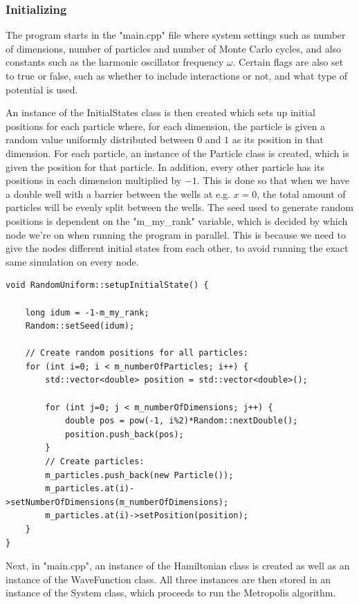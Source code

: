 \documentclass[../main.tex]{subfiles}
\begin{document}
\subsubsection{Initializing}

The program starts in the "main.cpp" file where system settings such as number of dimensions, number of particles and number of Monte Carlo cycles, and also constants such as the harmonic oscillator frequency $\omega$. Certain flags are also set to true or false, such as whether to include interactions or not, and what type of potential is used. 

An instance of the InitialStates class is then created which sets up initial positions for each particle where, for each dimension, the particle is given a random value uniformly distributed between $0$ and $1$ as its position in that dimension. For each particle, an instance of the Particle class is created, which is given the position for that particle. In addition, every other particle has its positions in each dimension multiplied by $-1$. This is done so that when we have a double well with a barrier between the wells at e.g. $x=0$, the total amount of particles will be evenly split between the wells. The seed used to generate random positions is dependent on the "m\_my\_rank" variable, which is decided by which node we're on when running the program in parallel. This is because we need to give the nodes different initial states from each other, to avoid running the exact same simulation on every node. 

\lstset{language=c++}
\begin{lstlisting}[title={Setting up the Initial State}]
void RandomUniform::setupInitialState() {

    long idum = -1-m_my_rank;
    Random::setSeed(idum);

    // Create random positions for all particles:
    for (int i=0; i < m_numberOfParticles; i++) {
        std::vector<double> position = std::vector<double>();

        for (int j=0; j < m_numberOfDimensions; j++) {
            double pos = pow(-1, i%2)*Random::nextDouble();
            position.push_back(pos);
        }
        // Create particles:
        m_particles.push_back(new Particle());
        m_particles.at(i)->setNumberOfDimensions(m_numberOfDimensions);
        m_particles.at(i)->setPosition(position);
    }
}
\end{lstlisting}

Next, in "main.cpp", an instance of the Hamiltonian class is created as well as an instance of the WaveFunction class. All three instances are then stored in an instance of the System class, which proceeds to run the Metropolis algorithm.
\end{document}
